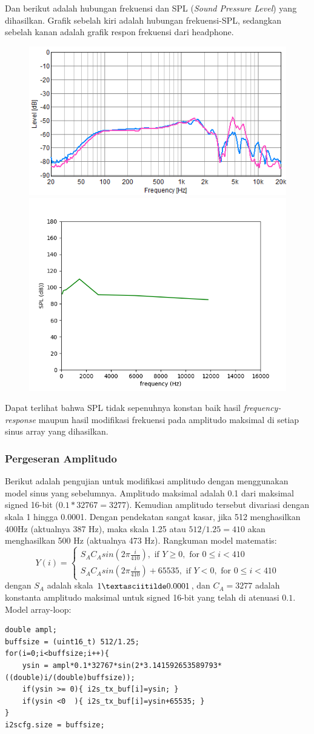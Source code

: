 \documentclass[12pt,]{article}
\begin{document}
	Dan berikut adalah hubungan	frekuensi dan SPL (\textit{Sound Pressure Level}) yang dihasilkan.
	Grafik sebelah kiri adalah hubungan frekuensi-SPL,
	sedangkan sebelah kanan adalah grafik respon frekuensi dari headphone.
	\begin{figure}[H]
		\centering
		\includegraphics[width=0.45\linewidth]{result/day_1/FreqResp_JBL}
		\includegraphics[width=0.45\linewidth]{result/analisa/freq_spl}
	\end{figure}
	Dapat terlihat bahwa SPL tidak sepenuhnya konstan baik hasil \textit{frequency-response}
	maupun hasil modifikasi frekuensi pada amplitudo maksimal di setiap sinus array yang dihasilkan.

	\newpage
	\subsubsection{Pergeseran Amplitudo}
	Berikut adalah pengujian untuk modifikasi amplitudo dengan menggunakan model sinus yang sebelumnya.
	Amplitudo maksimal adalah 0.1 dari maksimal signed 16-bit ($0.1*32767=3277$).
	Kemudian amplitudo tersebut divariasi dengan skala 1 hingga 0.0001.
	Dengan pendekatan sangat kasar, jika 512 menghasilkan 400Hz (aktualnya 387 Hz), maka skala 1.25 atau $512/1.25=410$
	akan menghasilkan 500 Hz (aktualnya 473 Hz).
	Rangkuman model matematis:
	\[
	Y(i) =
	\begin{cases}
	S_A C_A sin(2 \pi \frac{i}{410}), \text{ if } Y \geq 0, \text{ for } 0 \leq i < 410\\
	S_A C_A sin(2 \pi \frac{i}{410})+65535, \text{ if } Y < 0, \text{ for } 0 \leq i < 410
	\end{cases}
	\]
	dengan $S_A$ adalah skala $1 \textasciitilde 0.0001$, dan $C_A=3277$ adalah konstanta amplitudo maksimal
	untuk signed 16-bit yang telah di atenuasi $0.1$.
	Model array-loop:
	\begin{verbatim}
double ampl;
buffsize = (uint16_t) 512/1.25;
for(i=0;i<buffsize;i++){
	ysin = ampl*0.1*32767*sin(2*3.141592653589793*((double)i/(double)buffsize));
	if(ysin >= 0){ i2s_tx_buf[i]=ysin; }
	if(ysin <0  ){ i2s_tx_buf[i]=ysin+65535; }
}
i2scfg.size = buffsize;
	\end{verbatim}
\end{document}
